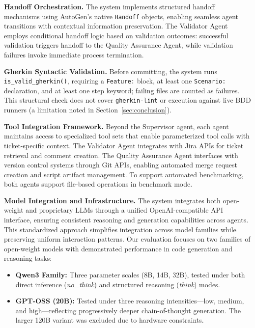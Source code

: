 \documentclass[runningheads]{llncs}
\begin{document}
\noindent \textbf{Handoff Orchestration.}
The system implements structured handoff mechanisms using AutoGen's native \texttt{Handoff} objects, enabling seamless agent transitions with contextual information preservation. The Validator Agent employs conditional handoff logic based on validation outcomes: successful validation triggers handoff to the Quality Assurance Agent, while validation failures invoke immediate process termination.

\noindent \textbf{Gherkin Syntactic Validation.}
Before committing, the system runs \texttt{is\_valid\_gherkin()}, requiring a \texttt{Feature:} block, at least one \texttt{Scenario:} declaration, and at least one step keyword; failing files are counted as failures. This structural check does not cover \texttt{gherkin-lint} or execution against live BDD runners (a limitation noted in Section~\ref{sec:conclusion}).

\noindent \textbf{Tool Integration Framework.}
Beyond the Supervisor agent, each agent maintains access to specialized tool sets that enable parameterized tool calls with ticket-specific context. The Validator Agent integrates with Jira APIs for ticket retrieval and comment creation. The Quality Assurance Agent interfaces with version control systems through Git APIs, enabling automated merge request creation and script artifact management. To support automated benchmarking, both agents support file-based operations in benchmark mode.

\noindent \textbf{Model Integration and Infrastructure.}
The system integrates both open-weight and proprietary LLMs through a unified OpenAI-compatible API interface, ensuring consistent reasoning and generation capabilities across agents. This standardized approach simplifies integration across model families while preserving uniform interaction patterns.
Our evaluation focuses on two families of open-weight models with demonstrated performance in code generation and reasoning tasks:

\begin{itemize}
  \item \textbf{Qwen3 Family:} Three parameter scales (8B, 14B, 32B), tested under both direct inference (\textit{no\_think}) and structured reasoning (\textit{think}) modes.
  \item \textbf{GPT-OSS (20B):} Tested under three reasoning intensities---low, medium, and high---reflecting progressively deeper chain-of-thought generation. The larger 120B variant was excluded due to hardware constraints.
\end{itemize}
\end{document}
